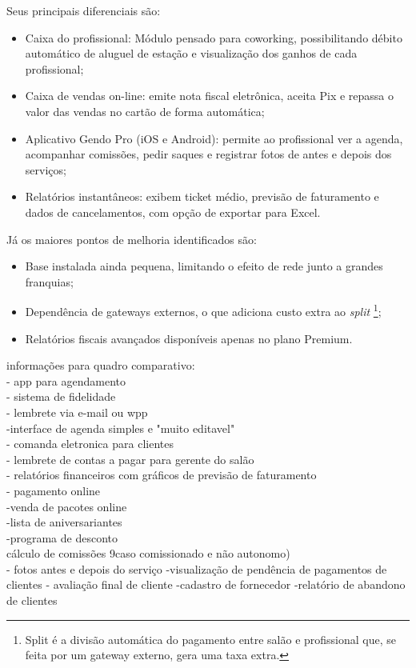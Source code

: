 Seus principais diferenciais são:
\begin{itemize}
	\item Caixa do profissional: Módulo pensado para coworking, possibilitando débito automático de aluguel de estação e visualização dos ganhos de cada profissional;
	\item Caixa de vendas on-line: emite nota fiscal eletrônica, aceita Pix e repassa o valor das vendas no cartão de forma automática;
	\item Aplicativo Gendo Pro (iOS e Android): permite ao profissional ver a agenda, acompanhar comissões, pedir saques e registrar fotos de antes e depois dos serviços;
	\item Relatórios instantâneos: exibem ticket médio, previsão de faturamento e dados de cancelamentos, com opção de exportar para Excel.
\end{itemize}


Já os maiores pontos de melhoria identificados são:
\begin{itemize}
	\item Base instalada ainda pequena, limitando o efeito de rede junto a grandes franquias;
	\item Dependência de gateways externos, o que adiciona custo extra ao \emph{split} \footnote{Split é a divisão automática do pagamento entre salão e profissional que, se feita por um gateway externo, gera uma taxa extra.};
	\item Relatórios fiscais avançados disponíveis apenas no plano Premium.
\end{itemize}

informações para quadro comparativo:\\

- app para agendamento\\
- sistema de fidelidade\\
- lembrete via e-mail ou wpp\\
-interface de agenda simples e "muito editavel"\\
- comanda eletronica para clientes\\
- lembrete de contas a pagar para gerente do salão\\
- relatórios financeiros com gráficos de previsão de faturamento\\
- pagamento online\\
-venda de pacotes online\\
-lista de aniversariantes\\
-programa de desconto\\
cálculo de comissões 9caso comissionado e não autonomo)\\
- fotos antes e depois do serviço
-visualização de pendência de pagamentos de clientes
- avaliação final de cliente
-cadastro de fornecedor
-relatório de abandono de clientes\\


